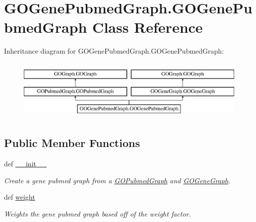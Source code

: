 \hypertarget{class_g_o_gene_pubmed_graph_1_1_g_o_gene_pubmed_graph}{
\section{GOGenePubmedGraph.GOGenePubmedGraph Class Reference}
\label{class_g_o_gene_pubmed_graph_1_1_g_o_gene_pubmed_graph}
}
Inheritance diagram for GOGenePubmedGraph.GOGenePubmedGraph:\begin{figure}[H]
\begin{center}
\leavevmode
\includegraphics[height=2.978723cm]{class_g_o_gene_pubmed_graph_1_1_g_o_gene_pubmed_graph}
\end{center}
\end{figure}
\subsection*{Public Member Functions}
\begin{DoxyCompactItemize}
\item 
def \hyperlink{class_g_o_gene_pubmed_graph_1_1_g_o_gene_pubmed_graph_a903ad3047a2d1b88fffbdeee60b2045e}{\_\-\_\-init\_\-\_\-}
\begin{DoxyCompactList}\small\item\em Create a gene pubmed graph from a \hyperlink{namespace_g_o_pubmed_graph}{GOPubmedGraph} and \hyperlink{namespace_g_o_gene_graph}{GOGeneGraph}. \item\end{DoxyCompactList}\item 
def \hyperlink{class_g_o_gene_pubmed_graph_1_1_g_o_gene_pubmed_graph_a9eb2cec10a76d3b4e8022184c4260add}{weight}
\begin{DoxyCompactList}\small\item\em Weights the gene pubmed graph based off of the weight factor. \item\end{DoxyCompactList}\end{DoxyCompactItemize}


